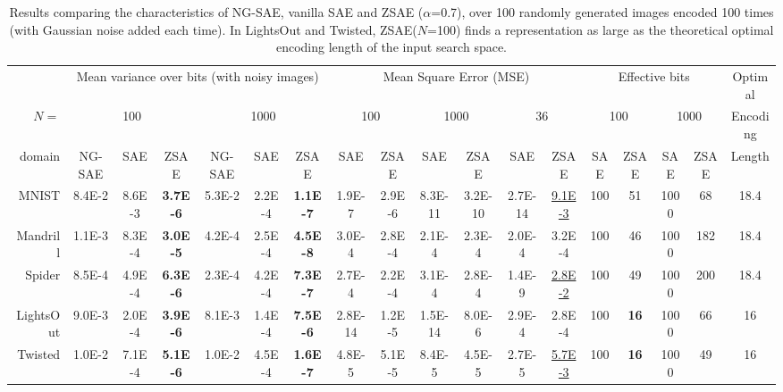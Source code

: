 \begin{table}[tbp]
 \centering
 \setlength{\tabcolsep}{0.25em}
 \begin{tabular}{|r|*{17}{c|}}
       & \multicolumn{6}{c|}{Mean variance over bits (with noisy images)}
       & \multicolumn{6}{c|}{Mean Square Error (MSE)}
       & \multicolumn{4}{c|}{Effective bits}
       & Optimal
  \\
$N=$ & \multicolumn{3}{c|}{100} & \multicolumn{3}{c|}{1000}
     & \multicolumn{2}{c|}{100} & \multicolumn{2}{c|}{1000} & \multicolumn{2}{c|}{36}
     & \multicolumn{2}{c|}{100} & \multicolumn{2}{c|}{1000}
  & Encoding
  \\
domain    & NG-SAE & SAE    & ZSAE            & NG-SAE & SAE    & ZSAE            & SAE     & ZSAE  & SAE    & ZSAE   & SAE    & ZSAE          & SAE & ZSAE        & SAE  & ZSAE & Length \\ 
MNIST     & 8.4E-2 & 8.6E-3 & \textbf{3.7E-6} & 5.3E-2 & 2.2E-4 & \textbf{1.1E-7} & 1.9E-7  &2.9E-6 &8.3E-11 &3.2E-10 &2.7E-14 &\uline{9.1E-3} & 100 & 51          & 1000 & 68   & 18.4   \\ 
Mandrill  & 1.1E-3 & 8.3E-4 & \textbf{3.0E-5} & 4.2E-4 & 2.5E-4 & \textbf{4.5E-8} & 3.0E-4  &2.8E-4 &2.1E-4  &2.3E-4  &2.0E-4  &{3.2E-4}       & 100 & 46          & 1000 & 182  & 18.4   \\ 
Spider    & 8.5E-4 & 4.9E-4 & \textbf{6.3E-6} & 2.3E-4 & 4.2E-4 & \textbf{7.3E-7} & 2.7E-4  &2.2E-4 &3.1E-4  &2.8E-4  &1.4E-9  &\uline{2.8E-2} & 100 & 49          & 1000 & 200  & 18.4   \\ 
LightsOut & 9.0E-3 & 2.0E-4 & \textbf{3.9E-6} & 8.1E-3 & 1.4E-4 & \textbf{7.5E-6} & 2.8E-14 &1.2E-5 &1.5E-14 &8.0E-6  &2.9E-4  &{2.8E-4}       & 100 & \textbf{16} & 1000 & 66   & 16     \\ 
Twisted   & 1.0E-2 & 7.1E-4 & \textbf{5.1E-6} & 1.0E-2 & 4.5E-4 & \textbf{1.6E-7} & 4.8E-5  &5.1E-5 &8.4E-5  &4.5E-5  &2.7E-5  &\uline{5.7E-3} & 100 & \textbf{16} & 1000 & 49   & 16     \\ 
\end{tabular}
 \caption{Results comparing the characteristics of NG-SAE, vanilla SAE and ZSAE ($\alpha$=0.7),
 over 100 randomly generated images encoded 100 times (with Gaussian noise added each time).
 In LightsOut and Twisted, ZSAE($N$=100) finds a representation as large as the theoretical optimal encoding length of the input search space.
 }
\label{tab:stability}
\end{table}

